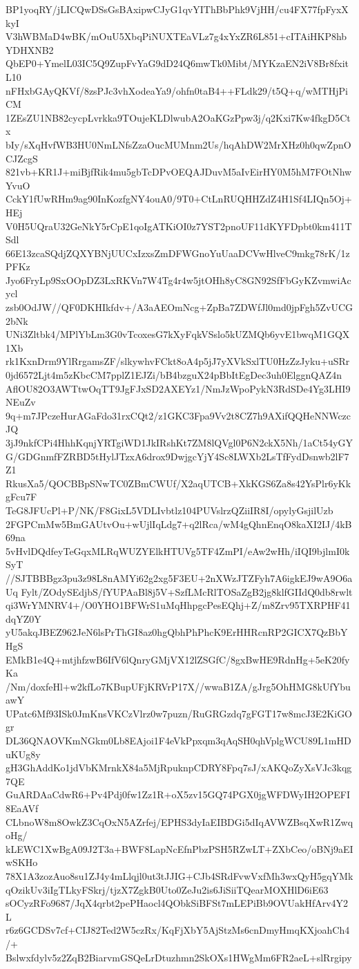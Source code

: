 BP1yoqRY/jLICQwDSsGsBAxipwCJyG1qvYIThBbPhk9VjHH/cu4FX77fpFyxXkyI
V3hWBMaD4wBK/mOuU5XbqPiNUXTEaVLz7g4xYxZR6L851+cITAiHKP8hbYDHXNB2
QbEP0+YmelL03IC5Q9ZupFvYaG9dD24Q6mwTk0Mibt/MYKzaEN2iV8Br8fxitL10
nFHxbGAyQKVf/8zsPJc3vhXodeaYa9/ohfn0taB4++FLdk29/t5Q+q/wMTHjPiCM
1ZEsZU1NB82cycpLvrkka9TOujeKLDlwubA2OaKGzPpw3j/q2Kxi7Kw4fkgD5Ctx
bIy/sXqHvfWB3HU0NmLNfsZzaOucMUMnm2Us/hqAhDW2MrXHz0h0qwZpnOCJZcgS
821vb+KR1J+miBjfRik4mu5gbTcDPvOEQAJDuvM5aIvEirHY0M5hM7FOtNhwYvuO
CckY1fUwRHm9ag90InKozfgNY4ouA0/9T0+CtLnRUQHHZdZ4H1Sf4LIQn5Oj+HEj
V0H5UQraU32GeNkY5rCpE1qoIgATKiOI0z7YST2pnoUF11dKYFDpbt0km411TSdl
66E13zcaSQdjZQXYBNjUUCxIzxsZmDFWGnoYuUaaDCVwHlveC9mkg78rK/1zPFKz
Jyo6FryLp9SxOOpDZ3LxRKVn7W4Tg4r4w5jtOHh8yC8GN92SfFbGyKZvmwiAcycl
zsb0OdJW//QF0DKHIkfdv+/A3aAEOmNcg+ZpBa7ZDWfJl0md0jpFgh5ZvUCG2bNk
UNi3Zltbk4/MPlYbLm3G0vTcoxesG7kXyFqkVSslo5kUZMQb6yvE1bwqM1GQX1Xb
rk1KxnDrm9YlRrgamsZF/slkywhvFCkt8oA4p5jJ7yXVkSxlTU0HzZzJyku+uSRr
0jd6572Ljt4m5zKbcCM7pplZ1EJZi/bB4bzguX24pBbItEgDec3uh0ElggnQAZ4n
AflOU82O3AWTtwOqTT9JgFJxSD2AXEYz1/NmJzWpoPykN3RdSDe4Yg3LHI9NEuZv
9q+m7JPczeHurAGaFdo31rxCQt2/z1GKC3Fpa9Vv2t8CZ7h9AXifQQHeNNWczcJQ
3jJ9nkfCPi4HhhKqnjYRTgiWD1JkIRshKt7ZM8lQVgl0P6N2ckX5Nh/1aCt54yGY
G/GDGnmfFZRBD5tHylJTzxA6drox9DwjgcYjY4Sc8LWXb2LsTfFydDsnwb2lF7Z1
RkusXa5/QOCBBpSNwTC0ZBmCWUf/X2aqUTCB+XkKGS6Za8s42YsPlr6yKkgFcu7F
TeG8JFUcPl+P/NK/F8GixL5VDLIvbtlz104PUVslrzQZiiIR8I/opylyGsjilUzb
2FGPCmMw5BmGAUtvOu+wUjlIqLdg7+q2lRca/wM4gQhnEnqO8kaXI2IJ/4kB69na
5vHvlDQdfeyTeGqxMLRqWUZYElkHTUVg5TF4ZmPI/eAw2wHh/iIQI9bjlmI0kSyT
//SJTBBBgz3pu3z98L8nAMYi62g2xg5F3EU+2nXWzJTZFyh7A6igkEJ9wA9O6aUq
Fylt/ZOdySEdjbS/fYUPAaBl8j5V+SzfLMcRlTOSaZgB2jg8klfGIIdQ0db8rwlt
qi3WrYMNRV4+/O0YHO1BFWrS1uMqHhpgcPesEQhj+Z/m8Zrv95TXRPHF41dqYZ0Y
yU5akqJBEZ962JeN6lsPrThGI8az0hgQbhPhPhcK9ErHHRcnRP2GICX7QzBbYHgS
EMkB1e4Q+mtjhfzwB6IfV6lQnryGMjVX12lZSGfC/8gxBwHE9RdnHg+5eK20fyKa
/Nm/doxfeHl+w2kfLo7KBupUFjKRVrP17X//wwaB1ZA/gJrg5OhHMG8kUfYbuawY
UPatc6Mf93ISk0JmKnsVKCzVlrz0w7puzn/RuGRGzdq7gFGT17w8mcJ3E2KiGOgr
DL36QNAOVKmNGkm0Lb8EAjoi1F4eVkPpxqm3qAqSH0qhVplgWCU89L1mHDuKUg8y
gH3GhAddKo1jdVbKMrnkX84a5MjRpuknpCDRY8Fpq7sJ/xAKQoZyXsVJc3kqg7QE
GuARDAaCdwR6+Pv4Pdj0fw1Zz1R+oX5zv15GQ74PGX0jgWFDWyIH2OPEFI8EaAVf
CLbnoW8m8OwkZ3CqOxN5AZrfej/EPHS3dyIaEIBDGi5dIqAVWZBsqXwR1ZwqoHg/
kLEWC1XwBgA09J2T3a+BWF8LapNcEfnPbzPSH5RZwLT+ZXbCeo/oBNj9aEIwSKHo
78X1A3zozAuo8su1ZJ4y4mLlqjl0ut3tJJIG+CJb4SRdFvwVxfMh3wxQyH5gqYMk
qOzikUv3iIgTLkyFSkrj/tjzX7ZgkB0Uto0ZeJu2is6JiSiiTQearMOXHlD6iE63
sOCyzRFo9687/JqX4qrbt2pePHaocl4QObkSiBFSt7mLEPiBb9OVUakHfArv4Y2L
r6z6GCDSv7cf+CIJ82Ted2W5czRx/KqFjXbY5AjStzMs6cnDmyHmqKXjoahCh4/+
Bslwxfdylv5z2ZqB2BiarvmGSQeLrDtuzhmn2SkOXs1HWgMm6FR2aeL+slRrgipy
